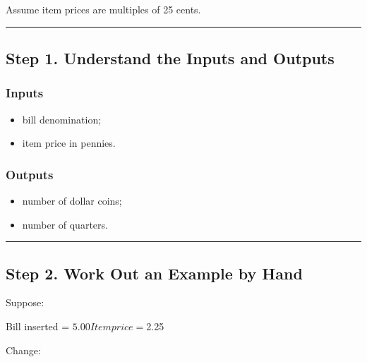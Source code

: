 \documentclass[
]{article}
\newenvironment{Shaded}{\begin{snugshade}}{\end{snugshade}}
\newcommand{\NormalTok}[1]{#1}
\providecommand{\tightlist}{%
  \setlength{\itemsep}{0pt}\setlength{\parskip}{0pt}}
\begin{document}
Assume item prices are multiples of 25 cents.

\begin{center}\rule{0.5\linewidth}{0.5pt}\end{center}

\subsection{Step 1. Understand the Inputs and
Outputs}\label{step-1.-understand-the-inputs-and-outputs}

\subsubsection{Inputs}\label{inputs}

\begin{itemize}
\tightlist
\item
  bill denomination;
\item
  item price in pennies.
\end{itemize}

\subsubsection{Outputs}\label{outputs}

\begin{itemize}
\tightlist
\item
  number of dollar coins;
\item
  number of quarters.
\end{itemize}

\begin{center}\rule{0.5\linewidth}{0.5pt}\end{center}

\subsection{Step 2. Work Out an Example by
Hand}\label{step-2.-work-out-an-example-by-hand}

Suppose:

\begin{Shaded}
\begin{Highlighting}[]
\NormalTok{Bill inserted = $5.00}
\NormalTok{Item price    = $2.25}
\end{Highlighting}
\end{Shaded}

Change:

\begin{Shaded}
\end{Shaded}
\end{document}
